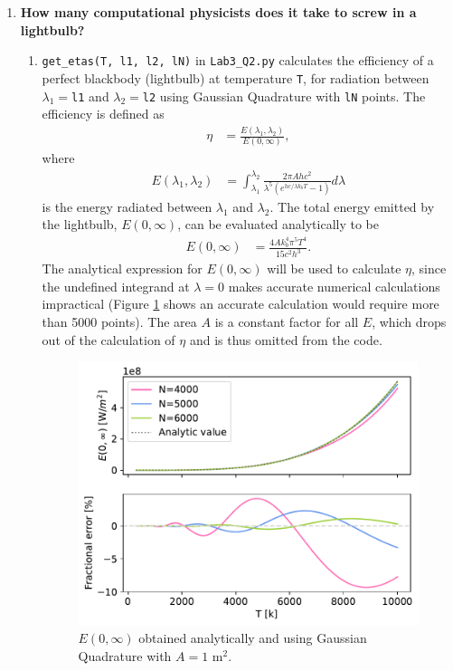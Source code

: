 \documentclass{article}
\newcommand{\code}{\texttt}
\begin{document}
\begin{enumerate}
\item \textbf{How many computational physicists does it take to screw in a lightbulb?}
\begin{enumerate}
  \item \code{get\_etas(T, l1, l2, lN)} in \code{Lab3\_Q2.py} calculates the efficiency of a perfect blackbody (lightbulb) at temperature \code{T}, 
  for radiation between $\lambda_1=$\code{l1} and $\lambda_2=$\code{l2} using Gaussian Quadrature with \code{lN} points. The efficiency is defined as 
  \begin{align*}
    \eta &= \frac{E(\lambda_1,\lambda_2)}{E(0,\infty)},
  \end{align*}
  where 
  \begin{align}
    E(\lambda_1,\lambda_2) &= \int_{\lambda_1}^{\lambda_2} \frac{2\pi Ahc^2}{\lambda^5(e^{hc/\lambda k_bT}-1)} d\lambda
  \end{align}
  is the energy radiated between $\lambda_1$ and $\lambda_2$.
  The total energy emitted by the lightbulb, $E(0, \infty)$, can be evaluated analytically to be
  \begin{align}
    E(0, \infty) &= \frac{4Ak_b^4\pi^5T^4}{15c^2h^3}.
  \end{align} 
  The analytical expression for $E(0,\infty)$ will be used to calculate $\eta$, since the undefined integrand at $\lambda=0$ makes accurate numerical calculations impractical (Figure \ref{fig:2a} shows an accurate calculation would require more than 5000 points). 
  The area $A$ is a constant factor for all $E$, which drops out of the calculation of $\eta$ and is thus omitted from the code.
  \begin{figure}[H]
    \centering 
    \captionsetup{margin=3.2cm}
    \includegraphics[width=0.48\linewidth]{Q2a.pdf}
    \caption{\label{fig:2a} $E(0,\infty)$ obtained analytically and using Gaussian Quadrature with $A=1$ m$^2$.}
    \end{figure}


\end{enumerate}
\end{enumerate}
\end{document}
